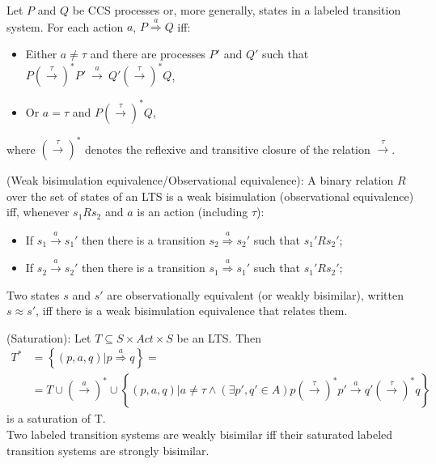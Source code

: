 \begin{definition}
Let $P$ and $Q$ be CCS processes or, more generally, states in a labeled transition system. For each action $a$,
$P\stackrel{a}{\Rightarrow}Q$ iff:
\begin{itemize}
	\item Either $a\neq\tau$ and there are processes $P'$ and $Q'$ such that $P\left(\stackrel{\tau}{\rightarrow}\right)^{*}P'\ \stackrel{a}{\rightarrow}\ Q'\left(\stackrel{\tau}{\rightarrow}\right)^{*}Q$,
	\item Or $a=\tau$ and $P\left(\stackrel{\tau}{\rightarrow}\right)^{*}Q$,
\end{itemize}
where $\left(\stackrel{\tau}{\rightarrow}\right)^{*}$ denotes the reflexive and transitive closure of the relation $\stackrel{\tau}{\rightarrow}$.
\end{definition}

\begin{definition}
(Weak bisimulation equivalence/Observational equivalence): A binary relation $R$ over the set of states of an LTS is a weak bisimulation (observational equivalence) iff, whenever $s_{1}Rs_{2}$ and $a$ is an action (including $\tau$):
\begin{itemize}
	\item If $s_{1}\stackrel{a}{\rightarrow}s_{1}'$ then there is a transition $s_{2}\stackrel{a}{\Rightarrow}s_{2}'$ such that $s_{1}'Rs_{2}'$;
	\item If $s_{2}\stackrel{a}{\rightarrow}s_{2}'$ then there is a transition $s_{1}\stackrel{a}{\Rightarrow}s_{1}'$ such that $s_{1}'Rs_{2}'$;
\end{itemize}
Two states $s$ and $s'$ are observationally equivalent (or weakly bisimilar), written $s\approx s'$, iff there is a weak bisimulation equivalence that relates them.
\end{definition}

\begin{definition}
(Saturation): Let $T\subseteq S\times Act\times S$ be an LTS. Then
\begin{align*}
 T^{*} &=\left\{\left(p,a,q\right)| p\stackrel{a}{\Rightarrow}q\right\}= \\
 &=T\cup\left(\stackrel{a}{\rightarrow}\right)^{*}\cup\left\{\left(p,a,q\right)| a\neq\tau\wedge\left(\exists p',q'\in A\right) p\left(\stackrel{\tau}{\rightarrow}\right)^{*}p'\stackrel{a}{\rightarrow}q'\left(\stackrel{\tau}{\rightarrow}\right)^{*}q\right\}
\end{align*} 
is a saturation of T.\\
Two labeled transition systems are weakly bisimilar iff their saturated labeled transition systems are strongly bisimilar. 
\end{definition}

